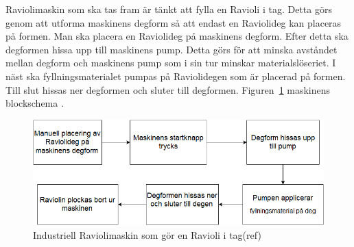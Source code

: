 Raviolimaskin som ska tas fram är tänkt att fylla en Ravioli i tag. Detta görs genom att utforma maskinens degform så att endast en Raviolideg kan placeras på formen. Man ska placera en Raviolideg på maskinens degform. Efter detta ska degformen hissa upp till maskinens pump. Detta görs för att minska avståndet mellan degform och maskinens pump som i sin tur minskar materialslöseriet. I näst ska fyllningsmaterialet pumpas på Raviolidegen som är placerad på formen. Till slut hissas ner degformen och sluter till degformen. Figuren~\ref{blockschema} maskinens blockschema .

\begin{figure}[ht]
	\begin{center}
		\includegraphics[scale=0.8]{images/blockschema.png}
		\caption{Industriell Raviolimaskin som gör en Ravioli i tag(ref)}
		\label{blockschema}	
	\end{center}
\end{figure}
